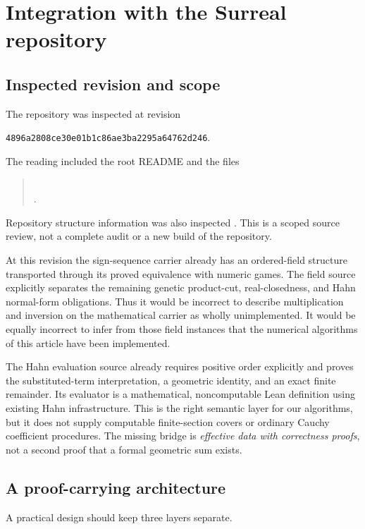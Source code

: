 \documentclass[11pt,letterpaper]{article}
\numberwithin{equation}{section}
\theoremstyle{definition}
\theoremstyle{remark}
\begin{document}
\section{Integration with the Surreal repository}
\label{sec:repo}

\subsection{Inspected revision and scope}

The repository was inspected at revision
\begin{center}
\texttt{4896a2808ce30e01b1c86ae3ba2295a64762d246}.
\end{center}
The reading included the root README and the files
\begin{quote}\small
{}\\
.
\end{quote}
Repository structure information was also inspected \cite{repo}. This is a
scoped source review, not a complete audit or a new build of the repository.

At this revision the sign-sequence carrier already has an ordered-field
structure transported through its proved equivalence with numeric games.
The field source explicitly separates the remaining genetic product-cut,
real-closedness, and Hahn normal-form obligations. Thus it would be
incorrect to describe multiplication and inversion on the mathematical
carrier as wholly unimplemented. It would be equally incorrect to infer
from those field instances that the numerical algorithms of this article
have been implemented.

The Hahn evaluation source already requires positive order explicitly and
proves the substituted-term interpretation, a geometric identity, and an
exact finite remainder. Its evaluator is a mathematical, noncomputable
Lean definition using existing Hahn infrastructure. This is the right
semantic layer for our algorithms, but it does not supply computable
finite-section covers or ordinary Cauchy coefficient procedures. The
missing bridge is \emph{effective data with correctness proofs}, not a
second proof that a formal geometric sum exists.

\subsection{A proof-carrying architecture}

A practical design should keep three layers separate.
\end{document}
